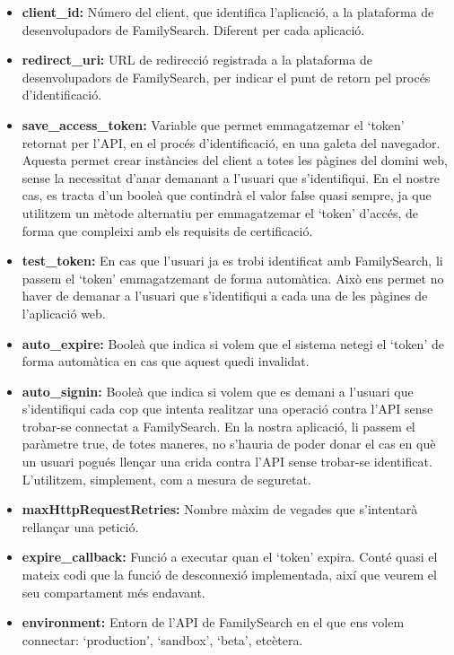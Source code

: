 \begin{itemize}
    \item \textbf{client\_id:} Número del client, que identifica l'aplicació, a la plataforma de desenvolupadors de FamilySearch. Diferent per cada aplicació.
    \item \textbf{redirect\_uri:} URL de redirecció registrada a la plataforma de desenvolupadors de FamilySearch, per indicar el punt de retorn pel procés d'identificació.
    \item \textbf{save\_access\_token:} Variable que permet emmagatzemar el `token' retornat per l'API, en el procés d'identificació, en una galeta del navegador. Aquesta permet crear instàncies del client a totes les pàgines del domini web, sense la necessitat d'anar demanant a l'usuari que s'identifiqui. En el nostre cas, es tracta d'un booleà que contindrà el valor false quasi sempre, ja que utilitzem un mètode alternatiu per emmagatzemar el `token' d'accés, de forma que compleixi amb els requisits de certificació.
    \item \textbf{test\_token:} En cas que l'usuari ja es trobi identificat amb FamilySearch, li passem el `token' emmagatzemant de forma automàtica. Això ens permet no haver de demanar a l'usuari que s'identifiqui a cada una de les pàgines de l'aplicació web.
    \item \textbf{auto\_expire:} Booleà que indica si volem que el sistema netegi el `token' de forma automàtica en cas que aquest quedi invalidat.
    \item \textbf{auto\_signin:} Booleà que indica si volem que es demani a l'usuari que s'identifiqui cada cop que intenta realitzar una operació contra l'API sense trobar-se connectat a FamilySearch. En la nostra aplicació, li passem el paràmetre true, de totes maneres, no s'hauria de poder donar el cas en què un usuari pogués llençar una crida contra l'API sense trobar-se identificat. L'utilitzem, simplement, com a mesura de seguretat.
    \item \textbf{maxHttpRequestRetries:} Nombre màxim de vegades que s'intentarà rellançar una petició.
    \item \textbf{expire\_callback:} Funció a executar quan el `token' expira. Conté quasi el mateix codi que la funció de desconnexió implementada, així que veurem el seu compartament més endavant.
    \item \textbf{environment:} Entorn de l'API de FamilySearch en el que ens volem connectar: `production', `sandbox', `beta', etcètera.
\end{itemize}

